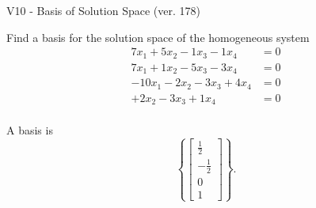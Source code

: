 \begin{exercise}
  \begin{exerciseTitle}V10 - Basis of Solution Space (ver. 178)\end{exerciseTitle}
  \begin{exerciseStatement}
    Find a basis for the solution space of the homogeneous system 
\begin{align*}
 7 x_ 1 + 5 x_ 2 -1 x_ 3 -1 x_ 4 &= 0  \\ 
  7 x_ 1 + 1 x_ 2 -5 x_ 3 -3 x_ 4 &= 0  \\ 
  -10 x_ 1 -2 x_ 2 -3 x_ 3 + 4 x_ 4 &= 0  \\ 
  + 2 x_ 2 -3 x_ 3 + 1 x_ 4 &= 0  \\ 
 \end{align*}


 
  \end{exerciseStatement}

  \begin{exerciseAnswer}
   A basis is   
\[\left\{\left[\begin{array}{c}
\frac{1}{2} \\
-\frac{1}{2} \\
0 \\
1
\end{array}\right]\right\}.\]

  


  \end{exerciseAnswer}
\end{exercise}